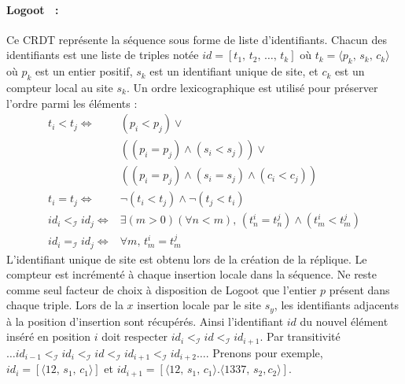 
\paragraph{Logoot~\cite{weiss2010collaborative, weiss2009logoot,
    weiss2010logootundo} :} Ce CRDT représente la séquence sous forme de liste
d'identifiants. Chacun des identifiants est une liste de triples notée
$id = [t_1,\,t_2,\,\ldots,\,t_k]$ où $t_k=\langle p_k,\,s_k,\,c_k \rangle$ où
$p_k$ est un entier positif, $s_k$ est un identifiant unique de site, et $c_k$
est un compteur local au site $s_k$. Un ordre lexicographique est utilisé pour
préserver l'ordre parmi les éléments :
\begin{align*}
  t_i < t_j \iff & (p_i < p_j) \vee \\
                 & ((p_i = p_j) \wedge (s_i<s_j)) \vee \\
                 & ((p_i = p_j) \wedge (s_i = s_j) \wedge (c_i < c_j)) \\
  t_i = t_j \iff & \neg (t_i < t_j) \wedge \neg (t_j < t_i) \\
  id_i <_\mathcal{I} id_j \iff & \exists (m > 0)(\forall n < m),\, (t^i_n = t^j_n) \wedge (t^i_m < t^j_m) \\
  id_i =_\mathcal{I} id_j \iff & \forall m,\, t^i_m = t^j_m
\end{align*}
L'identifiant unique de site est obtenu lors de la création de la réplique. Le
compteur est incrémenté à chaque insertion locale dans la séquence. Ne reste
comme seul facteur de choix à disposition de Logoot que l'entier $p$ présent
dans chaque triple. Lors de la $x$ insertion locale par le site $s_y$,
les identifiants adjacents à la position d'insertion sont récupérés. Ainsi
l'identifiant $id$ du nouvel élément inséré en position $i$ doit respecter
$id_{i}<_\mathcal{I} id <_\mathcal{I} id_{i+1}$. Par transitivité
$\ldots id_{i-1} <_\mathcal{I} id_{i} <_\mathcal{I} id <_\mathcal{I} id_{i+1}
<_\mathcal{I} id_{i+2} \ldots$.
Prenons pour exemple, $id_{i}=[\langle 12,\,s_1,\,c_1\rangle]$ et
$id_{i+1}=[\langle 12,\, s_1,\,c_1\rangle.\langle 1337,\, s_2, c_2\rangle]$.
